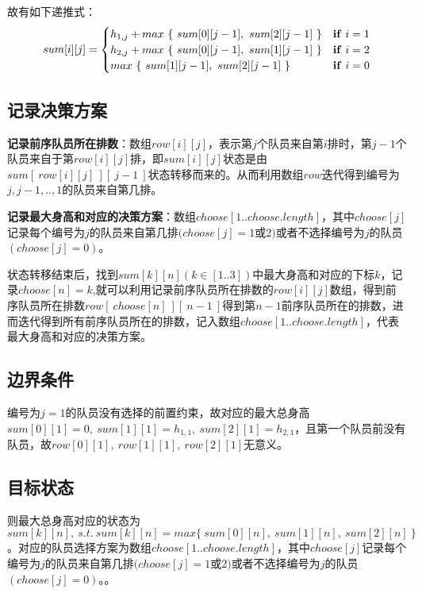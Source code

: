 \documentclass{article}
\begin{document}
故有如下递推式：
$$
sum[i][j]=\begin{cases}
h_{1,j}+max\ \{\ sum[0][j-1],\ sum[2][j-1]\ \}& {\bf if}\ i=1\\
h_{2,j}+max\ \{\ sum[0][j-1],\ sum[1][j-1]\ \}& {\bf if}\ i=2\\
max\ \{\ sum[1][j-1],\ sum[2][j-1]\ \}& {\bf if}\ i=0
\end{cases}
$$

\subsection{记录决策方案}

\textbf{记录前序队员所在排数}：数组$row[i][j]$，表示第$j$个队员来自第$i$排时，第$j-1$个队员来自于第$row[i][j]$排，即$sum[i][j]$状态是由$sum[\ row[i][j]\ ][\ j-1\ ]$状态转移而来的。从而利用数组$row$迭代得到编号为$j,j-1,.. ,1$的队员来自第几排。

\textbf{记录最大身高和对应的决策方案}：数组$choose[1..choose.length]$，其中$choose[j]$记录每个编号为$j$的队员来自第几排$(choose[j]=1$或$2)$或者不选择编号为$j$的队员$(choose[j]=0)$。


状态转移结束后，找到$sum[k][n](k\in [1..3])$中最大身高和对应的下标$k$，记录$choose[n]=k$,就可以利用记录前序队员所在排数的$row[i][j]$数组，得到前序队员所在排数$row[\ choose[n]\ ][\ n-1\ ]$得到第$n-1$前序队员所在的排数，进而迭代得到所有前序队员所在的排数，记入数组$choose[1..choose.length]$，代表最大身高和对应的决策方案。



\subsection{边界条件}
编号为$j=1$的队员没有选择的前置约束，故对应的最大总身高$sum[0][1]=0,\ sum[1][1]=h_{1,1},\ sum[2][1]=h_{2,1}$，且第一个队员前没有队员，故$row[0][1],\ row[1][1],\ row[2][1]$无意义。

\subsection{目标状态}
则最大总身高对应的状态为$sum[k][n],\ s.t.\ sum[k][n]=max\{\ sum[0][n],\ sum[1][n],\ sum[2][n]\ \}$。对应的队员选择方案为数组$choose[1..choose.length]$，其中$choose[j]$记录每个编号为$j$的队员来自第几排$(choose[j]=1$或$2)$或者不选择编号为$j$的队员$(choose[j]=0)$。。
\end{document}
